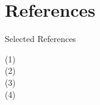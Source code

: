 \documentclass[
  size=12pt,
  paper=screen,
  mode=present,
  style=sailor
]{powerdot}
\begin{document}
\section[tocsection=true,slide=false]{References}

\begin{slide}{Selected References}
  
  (1)  \\ \vspace{10pt}
  (2)  \\ \vspace{10pt}
  (3)  \\ \vspace{10pt}
  (4)  \\ \vspace{10pt}
\end{slide}
\end{document}
